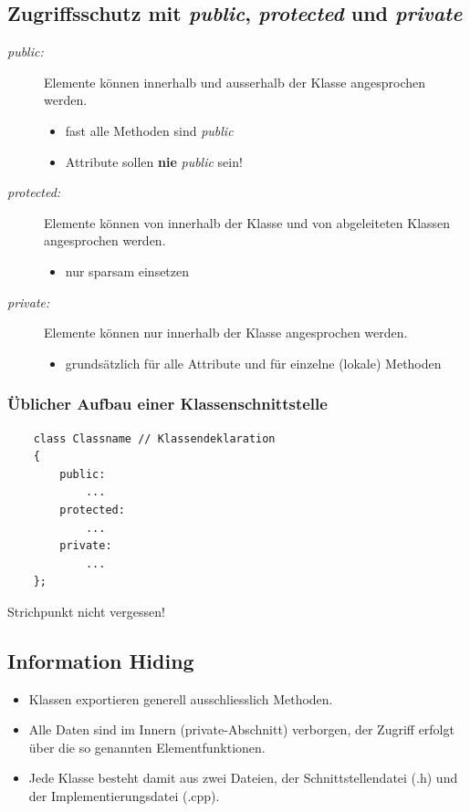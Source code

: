 \begin{multicols}{2}
\subsection{Zugriffsschutz mit \emph{public}, \emph{protected} und \emph{private}}
\begin{description}
	\item [\emph{public:}] Elemente können innerhalb und ausserhalb der Klasse angesprochen werden.
	\begin{itemize}
		\item fast alle Methoden sind \emph{public}
		\item Attribute sollen \textbf{nie} \emph{public} sein!
	\end{itemize}
	\item [\emph{protected:}] Elemente können von innerhalb der Klasse und von abgeleiteten Klassen angesprochen werden.
	\begin{itemize}
		\item nur sparsam einsetzen
	\end{itemize}
	\item [\emph{private:}] Elemente können nur innerhalb der Klasse angesprochen werden.
	\begin{itemize}
		\item grundsätzlich für alle Attribute und für einzelne (lokale) Methoden
	\end{itemize}
\end{description}
\vfill\null
\columnbreak
\subsubsection{Üblicher Aufbau einer Klassenschnittstelle}
\vspace{-\baselineskip}
\begin{minipage}{\linewidth}
	\begin{lstlisting}
	class Classname	// Klassendeklaration
	{
		public:
			...
		protected:
			...
		private:
			...
	};
	\end{lstlisting}
\end{minipage}
\begin{achtung}
	Strichpunkt nicht vergessen!
\end{achtung}
\end{multicols}

\subsection{Information Hiding}
\begin{itemize}
	\item Klassen exportieren generell ausschliesslich Methoden.
	\item[\-] Alle Daten sind im Innern (private-Abschnitt) verborgen, der Zugriff erfolgt über die so genannten Elementfunktionen.
	\item Jede Klasse besteht damit aus zwei Dateien, der Schnittstellendatei (.h) und der Implementierungsdatei (.cpp).
\end{itemize}

